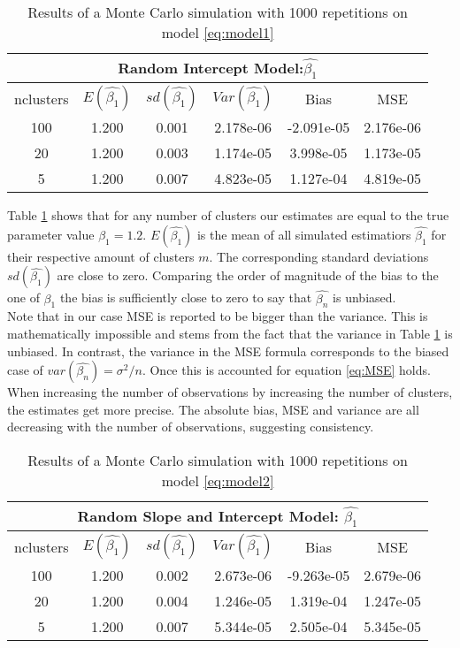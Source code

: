\documentclass[a4paper,11pt]{article}
\begin{document}
	\begin{table}[h!]
		\centering
		\begin{tabular}{||c c c c c c||} 
			 \hline
			\multicolumn{6}{|c|}{Random Intercept Model:$\hat{\beta_1}$} \\
			
			\hline
			nclusters & $E(\hat{\beta_1})$ & $sd(\hat{\beta_1})$ & $Var(\hat{\beta_1})$ & Bias & MSE \\ [0.5ex] 
			\hline
			100 & 1.200 & 0.001 & 	2.178e-06 & 	-2.091e-05 & 2.176e-06 \\ 
			20 & 1.200 & 0.003 & 1.174e-05 & 		3.998e-05 & 1.173e-05  \\ 	
			5 & 1.200 & 0.007 & 4.823e-05 & 	1.127e-04 & 4.819e-05  \\ 
	[1ex] 
			\hline
		\end{tabular}
		\caption{Results of a Monte Carlo simulation with 1000 repetitions on model \ref{eq:model1}}
		\label{table:1}
	\end{table}
	Table \ref{table:1} shows that for any number of clusters  our estimates are equal to the true parameter value $\beta_1=1.2$.  $E(\hat{\beta_1})$ is the mean of all simulated estimatiors $\hat{\beta_1}$ for their respective amount of clusters $m$. The corresponding standard deviations $sd(\hat{\beta_1})$ are close to zero. Comparing the order of magnitude of the bias to the one of $\beta_1$ the bias is sufficiently close to zero to say that $\hat{\beta_{n}}$ is unbiased. 
	\\	Note that in our case MSE is reported to be bigger than the variance. This is mathematically impossible and stems from the fact that the variance in Table \ref{table:1} is unbiased. In contrast, the variance in the MSE formula corresponds to the biased case of $var(\hat{\beta_{n}})=\sigma^2/n$. Once this is accounted for equation \ref{eq:MSE} holds.
	\\
	When increasing the number of observations by increasing the number of clusters, the estimates get more precise. The absolute bias, MSE and variance are all decreasing with the number of observations, suggesting consistency.
	\\ 



	\begin{table}[h!]
	\centering
	\begin{tabular}{||c c c c c c||} 
		\hline
		\multicolumn{6}{|c|}{Random Slope and Intercept Model: $\hat{\beta_1}$} \\
		
		\hline
		nclusters & $E(\hat{\beta_1})$ & $sd(\hat{\beta_1})$ & $Var(\hat{\beta_1})$ & Bias & MSE \\ [0.5ex] 
		\hline
		100 &1.200 &0.002&2.673e-06&-9.263e-05&2.679e-06 \\ 
		20 &1.200 &0.004&1.246e-05&1.319e-04& 1.247e-05 \\ 	
		5 & 1.200	&0.007&5.344e-05&	2.505e-04&5.345e-05 \\ 
		[1ex] 
		\hline
	\end{tabular}
	\caption{Results of a Monte Carlo simulation with 1000 repetitions on model \ref{eq:model2} }
	\label{table:2}
\end{table}
\end{document}
